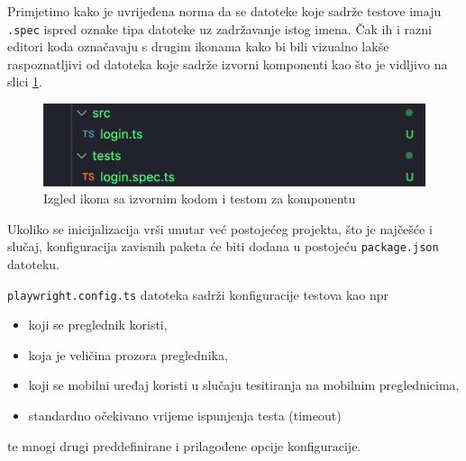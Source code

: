 Primjetimo kako je uvrijeđena norma da se datoteke koje sadrže testove imaju \texttt{.spec} ispred oznake tipa datoteke uz zadržavanje istog imena. Čak ih i razni editori koda označavaju s drugim ikonama kako bi bili vizualno lakše raspoznatljivi od datoteka koje sadrže izvorni komponenti kao što je vidljivo na slici \ref{img:filesLogos}.
\begin{figure}[!h]\begin{center}
    \includegraphics[width=1\textwidth]{"img/filesLogos"}
    \caption{Izgled ikona sa izvornim kodom i testom za komponentu}\label{img:filesLogos}
\end{center}\end{figure}

Ukoliko se inicijalizacija vrši unutar već postojećeg projekta, što je najčešće i slučaj, konfiguracija zavisnih paketa će biti dodana u postojeću \texttt{package.json} datoteku.

\texttt{playwright.config.ts} datoteka sadrži konfiguracije testova kao npr 
\begin{itemize}
    \item koji se preglednik koristi, 
    \item koja je veličina prozora preglednika, 
    \item koji se mobilni uređaj koristi u slučaju tesitiranja na mobilnim preglednicima,
    \item standardno očekivano vrijeme ispunjenja testa (timeout)
\end{itemize}
te mnogi drugi preddefinirane i prilagođene opcije konfiguracije.

